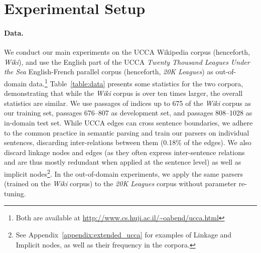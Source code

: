 \documentclass[11pt,a4paper]{article}
\newcommand{\tabref}[1]{Table~\ref{#1}}
\begin{document}
\section{Experimental Setup}\label{sec:exp_setup}

\paragraph{Data.}
We conduct our main experiments on the UCCA Wikipedia corpus (henceforth, \textit{Wiki}),
and use the English part of the UCCA \textit{Twenty Thousand Leagues Under the Sea} English-French parallel corpus (henceforth, \textit{20K Leagues}) as
out-of-domain data.\footnote{Both are available at \url{http://www.cs.huji.ac.il/~oabend/ucca.html}}
\tabref{table:data} presents some statistics for the two corpora, demonstrating that while
the \textit{Wiki} corpus is over ten times larger, the overall statistics are
similar.
We use passages of indices up to 675
of the \textit{Wiki} corpus as our training set, passages 676--807 as development set,
and passages 808--1028 as in-domain test set.
While UCCA edges can cross sentence boundaries, we adhere to the common
practice in semantic parsing and train our parsers on individual sentences,
discarding inter-relations between them (0.18\% of the edges).
We also discard linkage nodes and edges (as they often express inter-sentence
relations and are thus mostly redundant when applied at the sentence level)
as well as implicit nodes\footnote{See Appendix~\ref{appendix:extended_ucca} for examples
of Linkage and Implicit nodes, as well as their frequency in the corpora.}.
In the out-of-domain experiments, we apply the same parsers
(trained on the \textit{Wiki} corpus) to the \textit{20K Leagues} corpus
without parameter re-tuning.
\end{document}
